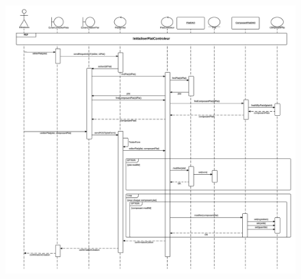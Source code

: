\documentclass{beamer}
\begin{document}
\begin{frame}[plain]{}
\begin{figure}
\centering
\includegraphics[scale=0.275]{../CasDUtilisations/CompositionPlat/sequence_EditerPlat.png}
\end{figure}
\end{frame}
\end{document}
